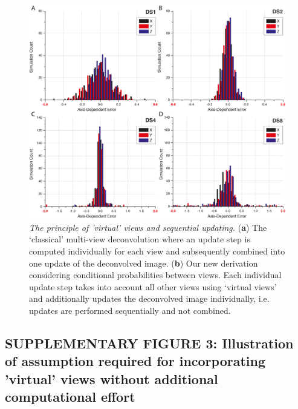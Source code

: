 \documentclass[]{spie}  %
\begin{document}
\vspace{1mm}

\begin{figure}[h!]
\includegraphics[width=\textwidth]{fig-downsampling-statistics-2.png}
\vspace{-2.0mm}
\caption{\hspace{-0.5mm}\emph{The principle of 'virtual' views and sequential updating.} (\textbf{a}) The ‘classical’ multi-view deconvolution\cite{Shepp1982, KrzicPhD, Temerinac2012, Bonetti2009} where an update step is computed individually for each view and subsequently combined into one update of the deconvolved image. (\textbf{b}) Our new derivation considering conditional probabilities between views. Each individual update step takes into account all other views using ‘virtual views’ and additionally updates the deconvolved image individually, i.e. updates are performed sequentially\cite{Hudson1994} and not combined.
}\label{fig:ds-stats-02}
\end{figure}

\pagebreak

\subsection*{SUPPLEMENTARY FIGURE 3: Illustration of assumption required for incorporating 'virtual' views without additional computational effort}

\vspace{1mm}
\end{document}
